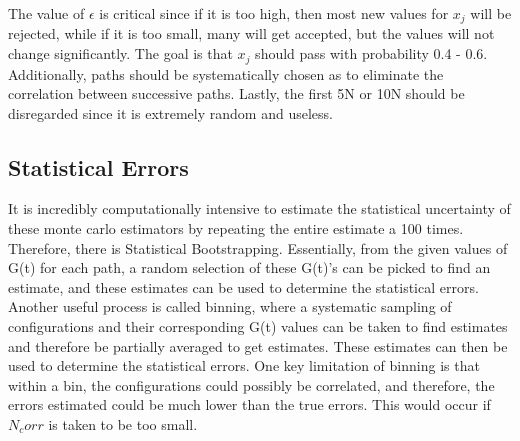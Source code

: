 \documentclass{article}
\begin{document}
The value of $\epsilon$ is critical since if it is too high, then most new values for $x_j$ will be rejected, while if it is too small, many will get accepted, but the values will not change significantly.
The goal is that $x_j$ should pass with probability 0.4 - 0.6.
Additionally, paths should be systematically chosen as to eliminate the correlation between successive paths.
Lastly, the first 5N or 10N should be disregarded since it is extremely random and useless.

\subsection{Statistical Errors}
It is incredibly computationally intensive to estimate the statistical uncertainty of these monte carlo estimators by repeating the entire estimate a 100 times. Therefore, there is Statistical Bootstrapping.
Essentially, from the given values of G(t) for each path, a random selection of these G(t)'s can be picked to find an estimate, and these estimates can be used to determine the statistical errors.
Another useful process is called binning, where a systematic sampling of configurations and their corresponding G(t) values can be taken to find estimates and therefore be partially averaged to get estimates. 
These estimates can then be used to determine the statistical errors.
One key limitation of binning is that within a bin, the configurations could possibly be correlated, and therefore, the errors estimated could be much lower than the true errors.
This would occur if $N_corr$ is taken to be too small.
\end{document}

